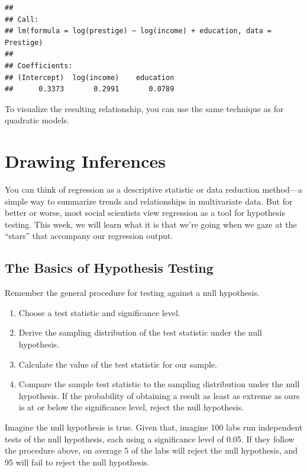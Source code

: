 \documentclass[12pt,oneside,openany]{book}
\begin{document}
\begin{verbatim}
## 
## Call:
## lm(formula = log(prestige) ~ log(income) + education, data = Prestige)
## 
## Coefficients:
## (Intercept)  log(income)    education  
##      0.3373       0.2991       0.0789
\end{verbatim}

To visualize the resulting relationship, you can use the same technique
as for quadratic models.

\chapter{Drawing Inferences}\label{inference}

\providecommand{\Cov}{}
\renewcommand{\Cov}{\mathop{\rm Cov}\nolimits}
\providecommand{\SE}{}
\renewcommand{\SE}{\mathop{\rm SE}\nolimits}
\providecommand{\CI}{}
\renewcommand{\CI}{\mathop{\rm CI}\nolimits}

You can think of regression as a descriptive statistic or data reduction
method---a simple way to summarize trends and relationships in
multivariate data. But for better or worse, most social scientists view
regression as a tool for hypothesis testing. This week, we will learn
what it is that we're going when we gaze at the ``stars'' that accompany
our regression output.

\section{The Basics of Hypothesis
Testing}\label{the-basics-of-hypothesis-testing}

Remember the general procedure for testing against a null hypothesis.

\begin{enumerate}
\def\labelenumi{\arabic{enumi}.}
\item
  Choose a test statistic and significance level.
\item
  Derive the sampling distribution of the test statistic under the null
  hypothesis.
\item
  Calculate the value of the test statistic for our sample.
\item
  Compare the sample test statistic to the sampling distribution under
  the null hypothesis. If the probability of obtaining a result as least
  as extreme as ours is at or below the significance level, reject the
  null hypothesis.
\end{enumerate}

Imagine the null hypothesis is true. Given that, imagine 100 labs run
independent tests of the null hypothesis, each using a significance
level of 0.05. If they follow the procedure above, on average 5 of the
labs will reject the null hypothesis, and 95 will fail to reject the
null hypothesis.
\end{document}
